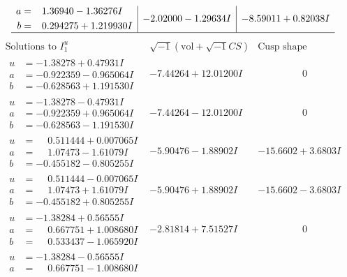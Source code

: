 \documentclass[1p]{elsarticle_modified}
\theoremstyle{definition}
\newcommand{\I}{\sqrt{-1}}
\begin{document}
$$\begin{array}{c|c|c}
\begin{aligned}
a &= \phantom{-}1.36940 - 1.36276 I \\
b &= \phantom{-}0.294275 + 1.219930 I\end{aligned}
 & -2.02000 - 1.29634 I & -8.59011 + 0.82038 I\\
 \hline 
 \end{array}$$\newpage$$\begin{array}{c|c|c}  
\text{Solutions to }I^u_{1}& \I (\text{vol} + \sqrt{-1}CS) & \text{Cusp shape}\\
 \hline 
\begin{aligned}
u &= -1.38278 + 0.47931 I \\
a &= -0.922359 - 0.965064 I \\
b &= -0.628563 + 1.191530 I\end{aligned}
 & -7.44264 + 12.01200 I & \phantom{-0.000000 } 0 \\ \hline\begin{aligned}
u &= -1.38278 - 0.47931 I \\
a &= -0.922359 + 0.965064 I \\
b &= -0.628563 - 1.191530 I\end{aligned}
 & -7.44264 - 12.01200 I & \phantom{-0.000000 } 0 \\ \hline\begin{aligned}
u &= \phantom{-}0.511444 + 0.007065 I \\
a &= \phantom{-}1.07473 - 1.61079 I \\
b &= -0.455182 - 0.805255 I\end{aligned}
 & -5.90476 - 1.88902 I & -15.6602 + 3.6803 I \\ \hline\begin{aligned}
u &= \phantom{-}0.511444 - 0.007065 I \\
a &= \phantom{-}1.07473 + 1.61079 I \\
b &= -0.455182 + 0.805255 I\end{aligned}
 & -5.90476 + 1.88902 I & -15.6602 - 3.6803 I \\ \hline\begin{aligned}
u &= -1.38284 + 0.56555 I \\
a &= \phantom{-}0.667751 + 1.008680 I \\
b &= \phantom{-}0.533437 - 1.065920 I\end{aligned}
 & -2.81814 + 7.51527 I & \phantom{-0.000000 } 0 \\ \hline\begin{aligned}
u &= -1.38284 - 0.56555 I \\
a &= \phantom{-}0.667751 - 1.008680 I \\

\end{aligned}
\end{array}$$
\end{document}
